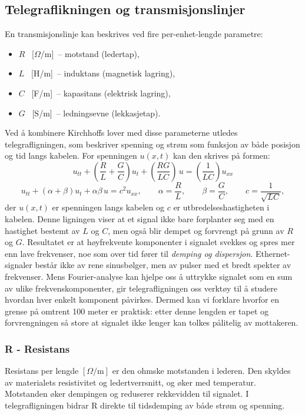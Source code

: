 \subsection{Telegraflikningen og transmisjonslinjer}
En transmisjonslinje kan beskrives ved fire per-enhet-lengde parametre:
\begin{itemize}
    \item $R$ \, [$\Omega$/m] \,-- motstand (ledertap),
    \item $L$ \, [H/m] \,-- induktans (magnetisk lagring),
    \item $C$ \, [F/m] \,-- kapasitans (elektrisk lagring),
    \item $G$ \, [S/m] \,-- ledningsevne (lekkasjetap).
\end{itemize}
Ved å kombinere Kirchhoffs lover med disse parameterne utledes telegrafligningen, som beskriver spenning og strøm som funksjon av både posisjon og tid langs kabelen. For spenningen $u(x,t)$ kan den skrives på formen:
\begin{equation}
    u_{tt} + \left(\frac{R}{L} + \frac{G}{C}\right)u_t + \left(\frac{RG}{LC}\right)\,u = \left(\frac{1}{LC}\right) u_{xx}
\end{equation}
\[
    u_{tt} + \left(\alpha + \beta\right)u_t + \alpha\beta\,u = c^2 u_{xx}, \qquad \alpha=\frac{R}{L}, \qquad \beta=\frac{G}{C}, \qquad c = \frac{1}{\sqrt{LC}} ,
\]
der $u(x,t)$ er spenningen langs kabelen og $c$ er utbredelseshastigheten i kabelen.  
Denne ligningen viser at et signal ikke bare forplanter seg med en hastighet bestemt av $L$ og $C$, men også blir dempet og forvrengt på grunn av $R$ og $G$. Resultatet er at høyfrekvente komponenter i signalet svekkes og spres mer enn lave frekvenser, noe som over tid fører til \emph{demping og dispersjon}.  
Ethernet-signaler består ikke av rene sinusbølger, men av pulser med et bredt spekter av frekvenser. Mens Fourier-analyse kan hjelpe oss  å uttrykke signalet som en sum av ulike frekvenskomponenter, gir telegrafligningen oss verktøy til å studere hvordan hver enkelt komponent påvirkes. Dermed kan vi forklare hvorfor en grense på omtrent 100 meter er praktisk: etter denne lengden er tapet og forvrengningen så store at signalet ikke lenger kan tolkes pålitelig av mottakeren.


\subsubsection{R - Resistans}
Resistans per lengde $[\Omega/\mathrm{m}]$ er den ohmske motstanden i lederen. Den skyldes av materialets resistivitet og ledertverrsnitt, og øker med temperatur. Motstanden øker dempingen og reduserer rekkevidden til signalet. I telegrafligningen bidrar R direkte til tidsdemping av både strøm og spenning.

